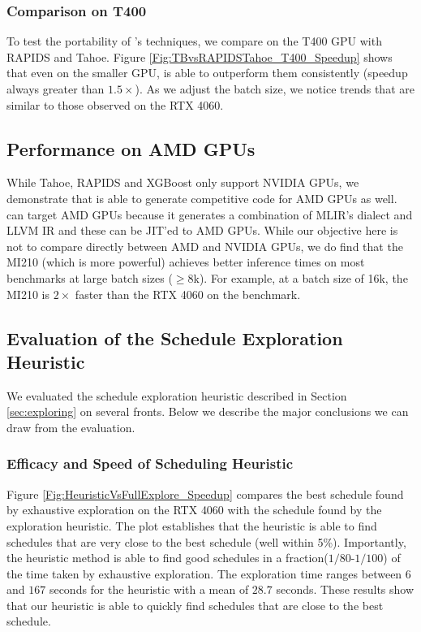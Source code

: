 \subsubsection*{Comparison on T400}
To test the portability of \Treebeard{}'s techniques, we compare \Treebeard{} on the T400 GPU with RAPIDS and Tahoe. 
Figure \ref{Fig:TBvsRAPIDSTahoe_T400_Speedup} shows 
that even on the smaller GPU, \Treebeard{} is able to outperform them consistently (speedup always greater than $1.5\times$). 
As we adjust the batch size, we notice trends that are similar to those observed on the RTX 4060.

\subsection{Performance on AMD GPUs}
While Tahoe, RAPIDS and XGBoost only support NVIDIA GPUs, we demonstrate that \Treebeard{} 
is able to generate competitive code for AMD GPUs as well. \Treebeard{} can target AMD GPUs 
because it generates a combination of MLIR's  dialect and LLVM IR 
and these can be JIT'ed to AMD GPUs. While our objective here is not to compare directly 
between AMD and NVIDIA GPUs, we do find that the MI210 (which is more powerful) achieves better inference times 
on most benchmarks at large batch sizes ($\geq8$k). For example, at a batch size of 16k,
the MI210 is $2\times$ faster than the RTX 4060 on the  benchmark. 

\subsection{Evaluation of the Schedule Exploration Heuristic}
We evaluated the schedule exploration heuristic described in Section \ref{sec:exploring} on several fronts.
Below we describe the major conclusions we can draw from the evaluation.

\subsubsection*{Efficacy and Speed of Scheduling Heuristic}
Figure \ref{Fig:HeuristicVsFullExplore_Speedup} compares the best schedule found by exhaustive exploration on the RTX 4060 
with the schedule found by the exploration heuristic.
The plot establishes that the 
heuristic is able to find schedules that are very close to the best schedule (well 
within 5\%). 
Importantly, the heuristic method is able to find good schedules in a fraction($1/80$-$1/100$) of the time taken by exhaustive exploration.
The exploration time ranges between $6$ and $167$ seconds for the heuristic with a mean of $28.7$ seconds.
These results show that our heuristic is able to quickly find schedules that are close to the best schedule.

